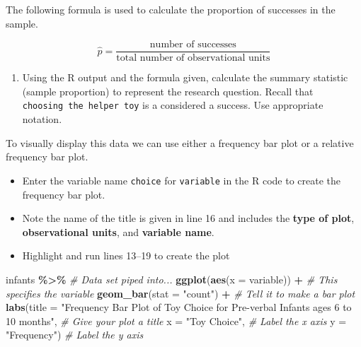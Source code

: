 \documentclass[
]{report}
\newenvironment{Shaded}{\begin{snugshade}}{\end{snugshade}}
\newcommand{\AttributeTok}[1]{\textcolor[rgb]{0.13,0.29,0.53}{#1}}
\newcommand{\CommentTok}[1]{\textcolor[rgb]{0.56,0.35,0.01}{\textit{#1}}}
\newcommand{\FunctionTok}[1]{\textcolor[rgb]{0.13,0.29,0.53}{\textbf{#1}}}
\newcommand{\NormalTok}[1]{#1}
\newcommand{\SpecialCharTok}[1]{\textcolor[rgb]{0.81,0.36,0.00}{\textbf{#1}}}
\newcommand{\StringTok}[1]{\textcolor[rgb]{0.31,0.60,0.02}{#1}}
\providecommand{\tightlist}{%
  \setlength{\itemsep}{0pt}\setlength{\parskip}{0pt}}
\begin{document}
The following formula is used to calculate the proportion of successes in the sample.

\[\hat{p} = \frac{\mbox{number of successes}}{\mbox{total number of observational units}}\]
\vspace{1mm}

\begin{enumerate}
\def\labelenumi{\arabic{enumi}.}
\setcounter{enumi}{1}
\tightlist
\item
  Using the R output and the formula given, calculate the summary statistic (sample proportion) to represent the research question. Recall that \texttt{choosing\ the\ helper\ toy} is a considered a success. Use appropriate notation.
\end{enumerate}

\vspace{0.5in}

\newpage

To visually display this data we can use either a frequency bar plot or a relative frequency bar plot.

\begin{itemize}
\item
  Enter the variable name \texttt{choice} for \texttt{variable} in the R code to create the frequency bar plot.
\item
  Note the name of the title is given in line 16 and includes the \textbf{type of plot}, \textbf{observational units}, and \textbf{variable name}.
\item
  Highlight and run lines 13--19 to create the plot
\end{itemize}

\begin{Shaded}
\begin{Highlighting}[]
\NormalTok{infants }\SpecialCharTok{\%\textgreater{}\%} \CommentTok{\# Data set piped into...}
    \FunctionTok{ggplot}\NormalTok{(}\FunctionTok{aes}\NormalTok{(}\AttributeTok{x =}\NormalTok{ variable)) }\SpecialCharTok{+}   \CommentTok{\# This specifies the variable}
    \FunctionTok{geom\_bar}\NormalTok{(}\AttributeTok{stat =} \StringTok{"count"}\NormalTok{) }\SpecialCharTok{+}  \CommentTok{\# Tell it to make a bar plot}
    \FunctionTok{labs}\NormalTok{(}\AttributeTok{title =} \StringTok{"Frequency Bar Plot of Toy Choice for Pre{-}verbal Infants ages 6 to 10 months"}\NormalTok{,  }
       \CommentTok{\# Give your plot a title}
       \AttributeTok{x =} \StringTok{"Toy Choice"}\NormalTok{,   }\CommentTok{\# Label the x axis}
       \AttributeTok{y =} \StringTok{"Frequency"}\NormalTok{)  }\CommentTok{\# Label the y axis}
\end{Highlighting}
\end{Shaded}
\end{document}

